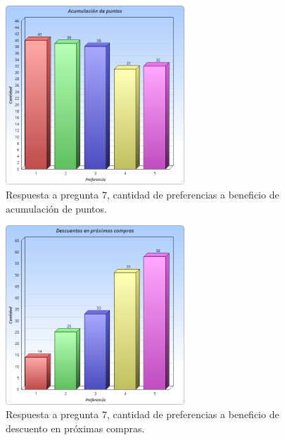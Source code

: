 \begin{figure}[!htb]
  \centering
  \includegraphics[width=0.6\textwidth]{images/Graficos/graf_5_6.png}
  \caption[chart5.6]{Respuesta a pregunta $7$, cantidad de preferencias a beneficio de acumulación de puntos.}
  \label{fig:chart5.6}
\end{figure}

\begin{figure}[!htb]
  \centering
  \includegraphics[width=0.6\textwidth]{images/Graficos/graf_5_7.png}
  \caption[chart5.7]{Respuesta a pregunta $7$, cantidad de preferencias a beneficio de descuento en
próximas compras.}
  \label{fig:chart5.7}
\end{figure}

